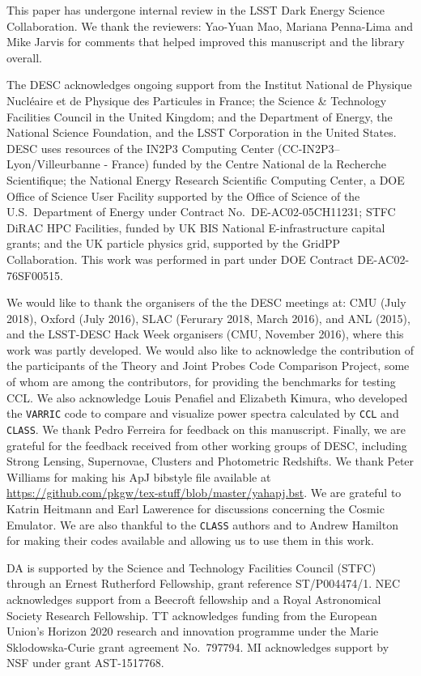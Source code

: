%
This paper has undergone internal review in the LSST Dark Energy Science Collaboration. We thank the reviewers: Yao-Yuan Mao, Mariana Penna-Lima and Mike Jarvis for comments that helped improved this manuscript and the \ccl library overall. 

The DESC acknowledges ongoing support from the Institut National de Physique Nucl\'eaire et de Physique des Particules in France; the Science \& Technology Facilities Council in the United Kingdom; and the Department of Energy, the National Science Foundation, and the LSST Corporation in the United States.  DESC uses resources of the IN2P3 Computing Center (CC-IN2P3--Lyon/Villeurbanne - France) funded by the Centre National de la Recherche Scientifique; the National Energy Research Scientific Computing Center, a DOE Office of Science User Facility supported by the Office of Science of the U.S.\ Department of Energy under Contract No.\ DE-AC02-05CH11231; STFC DiRAC HPC Facilities, funded by UK BIS National E-infrastructure capital grants; and the UK particle physics grid, supported by the GridPP Collaboration.  This work was performed in part under DOE Contract DE-AC02-76SF00515. 

We would like to thank the organisers of the the DESC meetings at: CMU (July 2018), Oxford (July 2016), SLAC (Ferurary 2018, March 2016), and ANL (2015), and the LSST-DESC Hack Week organisers (CMU, November 2016), where this work was partly developed. We would also like to acknowledge the contribution of the participants of the Theory and Joint Probes Code Comparison Project, some of whom are among the \ccl contributors, for providing the benchmarks for testing CCL. We also acknowledge Louis Penafiel and Elizabeth Kimura, who developed the {\tt VARRIC} code to compare and visualize power spectra calculated by {\tt CCL} and {\tt CLASS}. We thank Pedro Ferreira for feedback on this manuscript. Finally, we are grateful for the feedback received from other working groups of DESC, including Strong Lensing, Supernovae, Clusters and Photometric Redshifts.
We thank Peter Williams for making his ApJ bibstyle file available at \url{https://github.com/pkgw/tex-stuff/blob/master/yahapj.bst}. We are grateful to Katrin Heitmann and Earl Lawerence for discussions concerning the Cosmic Emulator. We are also thankful to the {\tt CLASS} authors and to Andrew Hamilton for making their codes available and allowing us to use them in this work. 
%

DA is supported by the Science and Technology Facilities Council (STFC) through an Ernest Rutherford Fellowship, grant reference ST/P004474/1. NEC acknowledges support from a Beecroft fellowship and a Royal Astronomical Society Research Fellowship. TT acknowledges funding from the European Union's Horizon 2020 research and innovation programme under the Marie Sk{l}odowska-Curie grant agreement No.\ 797794. MI acknowledges support by NSF under grant AST-1517768.
